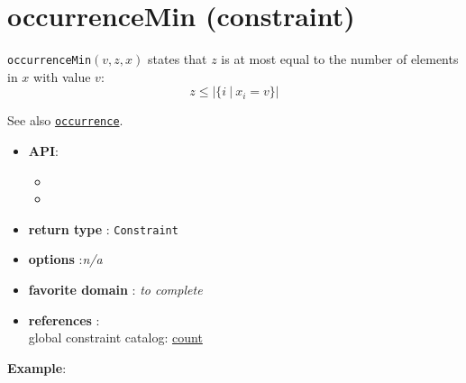 \label{occurrencemin}
\hypertarget{occurrencemin}{}

\section{occurrenceMin (constraint)}\label{occurrencemin:occurrenceminconstraint}\hypertarget{occurrencemin:occurrenceminconstraint}{}
\begin{notedef}
  \texttt{occurrenceMin}$(v,z,x)$ states that $z$ is at most equal to the number of elements in $x$ with value $v$:
$$z\le|\{i\ |\ x_i=v\}|$$   
\end{notedef}
  See also \hyperlink{occurrence:occurrenceconstraint}{\tt occurrence}.

\begin{itemize}
	\item \textbf{API}:
      \begin{itemize}
      \item {}
      \item {}
      \end{itemize}
	\item \textbf{return type} : \texttt{Constraint}
	\item \textbf{options} :\emph{n/a}
	\item \textbf{favorite domain} : \emph{to complete}
	\item \textbf{references} :\\
      global constraint catalog: \href{http://www.emn.fr/x-info/sdemasse/gccat/Ccount.html}{count}
\end{itemize}

\textbf{Example}:

